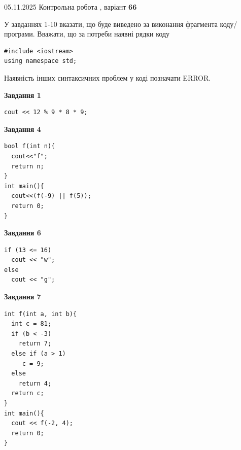 \documentclass[12pt, ukrainian]{article}
\begin{document}
\newpage

{\Large{05.11.2025 Контрольна робота , варіант  \No \textbf { 66 }\par}}
{
\begin {large}
У завданнях 1-10 вказати, що буде виведено за виконання фрагмента коду/про\-гра\-ми.
Вважати, що за потреби наявні рядки коду
\begin{verbatim}
#include <iostream>
using namespace std;
\end{verbatim}
Наявність інших синтаксичних проблем у коді позначати ERROR.

\begin{minipage}[t]{7.0cm}

\begin{center}
\textbf{Завдання 1}
\end{center}
\vspace{-8mm}

\begin{verbatim}
cout << 12 % 9 * 8 * 9;
\end{verbatim}



\begin{center}
\textbf{Завдання 4}
\end{center}
\vspace{-8mm}

\begin{verbatim}
bool f(int n){
  cout<<"f";
  return n;
}
int main(){
  cout<<(f(-9) || f(5));
  return 0;
}
\end{verbatim}



\begin{center}
\textbf{Завдання 6}
\end{center}
\vspace{-8mm}

\begin{verbatim}
if (13 <= 16)
  cout << "w";
else
  cout << "g";
\end{verbatim}



\begin{center}
\textbf{Завдання 7}
\end{center}
\vspace{-8mm}

\begin{verbatim}
int f(int a, int b){
  int c = 81;
  if (b < -3)
    return 7;
  else if (a > 1)
     c = 9;
  else
    return 4;
  return c;
}
int main(){
  cout << f(-2, 4);
  return 0;
}
\end{verbatim}


\end{minipage}
\end{large}}
\end{document}
